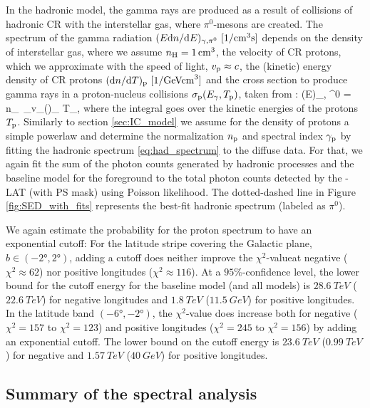 In the hadronic model, the gamma rays are produced as a result of collisions of hadronic CR with the interstellar gas, where $\pi^0$-mesons are created.
The spectrum of the gamma radiation $(E \de n / \de E)_{\gamma,\pi^0}\ [\SI{}{1/cm^3s}]$ depends on the density of interstellar gas, where we assume $n_{\text{H}} = \SI{1}{/cm^3}$, the velocity of CR protons, which we approximate with the speed of light, $v_{\text{p}} \approx c$, the (kinetic) energy density of CR protons $(\text{d} n / \text{d} T)_{\text{p}}\ [\SI{}{1/GeVcm^3}]$ and the cross section to produce gamma rays in a proton-nucleus collisions $\sigma_{\text{p}} (E_\gamma, T_{\text{p}})$, taken from :
\be
\left(E\right)_{\!\!\gamma, \pi^0}\! = \int n_\Hy\ \sigma_\pr v_\pr \left(\right)_{\!\!\pr} \de T_\pr,
\label{eq:had_spectrum}
\ee
where the integral goes over the kinetic energies of the protons $T_{\text{p}}$. Similarly to section \ref{sec:IC_model} we assume for the density of protons a simple powerlaw and determine the normalization $n_{\text{p}}$ and spectral index $\gamma_{\text{p}}$  by fitting the hadronic spectrum \eqref{eq:had_spectrum} to the diffuse \Fermi data. For that, we again fit the sum of the photon counts generated by hadronic processes and the baseline model for the foreground to the total photon counts detected by the \Fermi-LAT (with PS mask) using Poisson likelihood.  The dotted-dashed line in Figure \ref{fig:SED_with_fits} represents the best-fit hadronic spectrum (labeled as $\pi^0$).

We again estimate the probability for the proton spectrum to have an exponential cutoff: For the latitude stripe covering the Galactic plane, $b \in (-\ang{2}, \ang{2})$, adding a cutoff does neither improve the $\chi^2$-valueat negative ($\chi^2 \approx 62$) nor positive longitudes ($\chi^2 \approx 116$). At a $95\%$-confidence level, the lower bound for the cutoff energy for the baseline model (and all models) is $\SI{28.6}{TeV}$ ($\SI{22.6}{TeV}$) for negative longitudes and $\SI{1.8}{TeV}$ ($\SI{11.5}{GeV}$) for positive longitudes.\\
In the latitude band $(-\ang{6}, -\ang{2})$, the $\chi^2$-value does increase both for negative ($\chi^2 = 157$ to $\chi^2 = 123$) and positive longitudes ($\chi^2 = 245$ to $\chi^2 = 156$) by adding an exponential cutoff. The lower bound on the cutoff energy is $\SI{23.6}{TeV}$ ($\SI{0.99}{TeV}$) for negative and $\SI{1.57}{TeV}$ ($\SI{40}{GeV}$) for positive longitudes.



\subsection{Summary of the spectral analysis}

